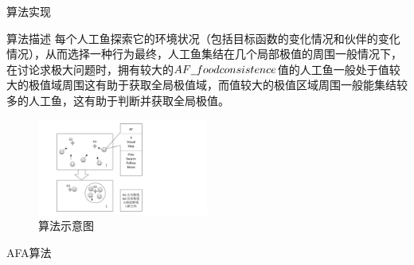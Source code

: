 \documentclass[UTF8]{ctexart}
\begin{document}
\begin{section}{算法实现}

\begin{subsection}{算法描述}
每个人工鱼探索它的环境状况（包括目标函数的变化情况和伙伴的变化情况），从而选择一种行为最终，人工鱼集结在几个局部极值的周围一般情况下，在讨论求极大问题时，拥有较大的$AF\underline{\hspace{0.5em}}foodconsistence$值的人工鱼一般处于值较大的极值域周围这有助于获取全局极值域，而值较大的极值区域周围一般能集结较多的人工鱼，这有助于判断并获取全局极值。
\begin{figure}[htbp]
	\centering
	\includegraphics[width=0.5\textwidth]{../../pic/fish3.pdf}
	\caption{算法示意图}
\end{figure}

\begin{algorithm}[H]
\caption{AFA算法}\label{fish_alg}
 \scriptsize
\begin{algorithmic}
	\ENDWHILE
\end{algorithmic}
\end{algorithm}
\end{subsection}


\end{section}
\end{document}
